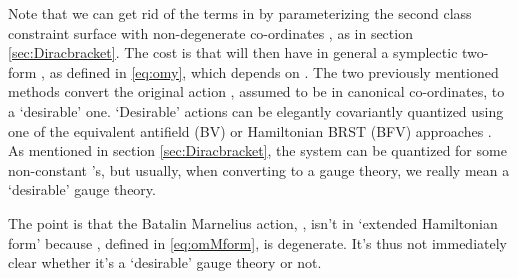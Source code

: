 \documentclass[a4paper,12pt]{article}
\theoremstyle{definition}
\theoremstyle{remark}
\numberwithin{equation}{section}
\providecommand{\al}{\alpha}
\providecommand{\om}{\omega}
\providecommand{\bx}{\bar{x}}
\begin{document}
Note that we can get rid of the \myHighlight{$\theta^{\al}(x)$}\coordHE{} terms in
\coordHE{} by parameterizing the second class constraint surface
with non-degenerate co-ordinates \coordHE{}, as in section
\ref{sec:Diracbracket}. The cost is that \coordHE{} will then have
in general a symplectic two-form \myHighlight{$\om_{\mu\nu}(y)$}\coordHE{}, as defined in
\eqref{eq:omy}, which depends on \coordHE{}. The two previously
mentioned methods convert the original action \coordHE{}, assumed to
be in canonical co-ordinates, to a `desirable' one. `Desirable'
actions can be elegantly covariantly quantized using one of the
equivalent antifield (BV) or Hamiltonian BRST (BFV) approaches
\cite{Henneaux:1992ig}. As mentioned in section
\ref{sec:Diracbracket}, the system can be quantized for some
non-constant \myHighlight{$\om_{ij}(x)$}\coordHE{}'s, but usually, when converting to a
gauge theory, we really mean a `desirable' gauge theory.

The point is that the Batalin Marnelius action, \myHighlight{$S[\bx(x)]$}\coordHE{}, isn't
in `extended Hamiltonian form' because \myHighlight{$\om_M(x)_{km}$}\coordHE{}, defined in
\eqref{eq:omMform}, is degenerate. It's thus not immediately
clear whether it's a `desirable' gauge theory or not.
\end{document}
